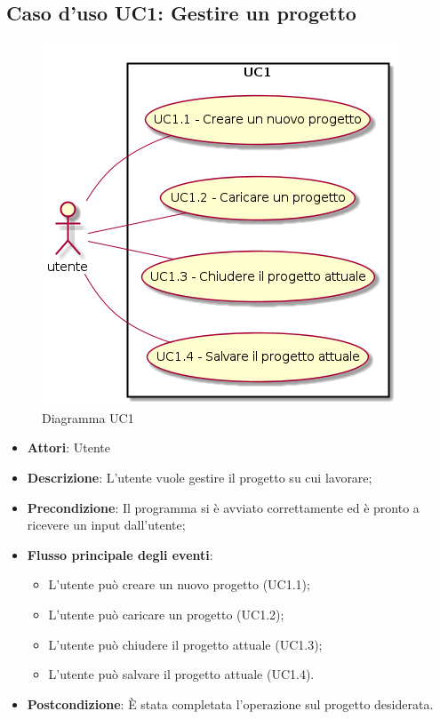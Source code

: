 \documentclass[../AnalisiDeiRequisiti.tex]{subfiles}
\begin{document}
	\subsection{Caso d'uso UC1: Gestire un progetto}
		\begin{figure} [H]
			\centering
			\includegraphics[scale=0.45]{./Figures/UC1.png}
			\caption{Diagramma UC1}\label{}
		\end{figure}
	\begin{itemize}
		\item \textbf{Attori}: Utente
		\item \textbf{Descrizione}: L'utente vuole gestire il progetto su cui lavorare;
		\item \textbf{Precondizione}: Il programma si è avviato correttamente ed è pronto a ricevere un input dall'utente;
		\item \textbf{Flusso principale degli eventi}: \begin{itemize}
			\item L'utente può creare un nuovo progetto (UC1.1);
			\item L'utente può caricare un progetto (UC1.2);
			\item L'utente può chiudere il progetto attuale (UC1.3);
			\item L'utente può salvare il progetto attuale (UC1.4).
		\end{itemize}
		\item \textbf{Postcondizione}: È stata completata l'operazione sul progetto desiderata.
	\end{itemize}
\end{document}
